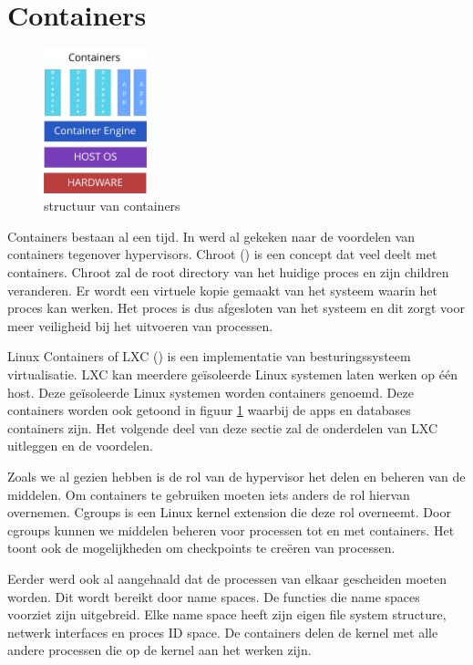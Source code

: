 \documentclass[pdftex,a4paper,12pt,twoside]{report}
\begin{document}
\section{Containers}

\begin{figure}
    \centering
    \includegraphics[width=3cm]{img/container}
    \caption{structuur van containers}
    \label{fig:containers}
\end{figure}

Containers bestaan al een tijd. In \cite{soltesz_container-based_2007} werd al gekeken naar de voordelen van containers tegenover hypervisors. Chroot (\cite{Linux}) is een concept dat veel deelt met containers. Chroot zal de root directory van het huidige proces en zijn children veranderen. Er wordt een virtuele kopie gemaakt van het systeem waarin het proces kan werken. Het proces is dus afgesloten van het systeem en dit zorgt voor meer veiligheid bij het uitvoeren van processen.

Linux Containers of LXC (\cite{containers_linux_????}) is een implementatie van besturingssysteem virtualisatie. LXC kan meerdere geïsoleerde Linux systemen laten werken op één host. Deze geïsoleerde Linux systemen worden containers genoemd. Deze containers worden ook getoond in figuur \ref{fig:containers} waarbij de apps en databases containers zijn. Het volgende deel van deze sectie zal de onderdelen van LXC uitleggen en de voordelen.

Zoals we al gezien hebben is de rol van de hypervisor het delen en beheren van de middelen. Om containers te gebruiken moeten iets anders de rol hiervan overnemen. Cgroups is een Linux kernel extension die deze rol overneemt. Door cgroups kunnen we middelen beheren voor processen tot en met containers. Het toont ook de mogelijkheden om checkpoints te creëren van processen.

Eerder werd ook al aangehaald dat de processen van elkaar gescheiden moeten worden. Dit wordt bereikt door name spaces. De functies die name spaces voorziet zijn uitgebreid. Elke name space heeft zijn eigen file system structure, netwerk interfaces en proces ID space. De containers delen de kernel met alle andere processen die op de kernel aan het werken zijn.
\end{document}
